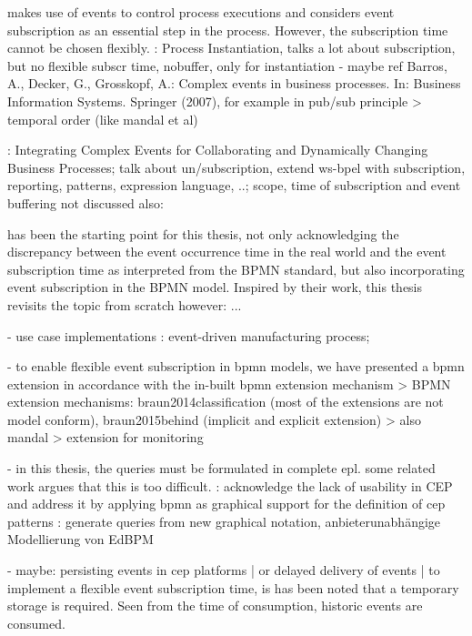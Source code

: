 \cite{Pufahl2017} makes use of events to control process executions and considers event subscription as an essential step in the process. However, the subscription time cannot be chosen flexibly.
\cite{decker2008instantiation}: Process Instantiation, talks a lot about subscription, but no flexible subscr time, nobuffer, only for instantiation
- maybe ref Barros, A., Decker, G., Grosskopf, A.: Complex events in business processes. In: Business Information Systems. Springer (2007), for example in pub/sub principle > temporal order (like mandal et al)


\cite{von2010integrating}: Integrating Complex Events for Collaborating and Dynamically Changing Business Processes; talk about un/subscription, extend ws-bpel with subscription, reporting, patterns, expression language, ..; scope, time of subscription and event buffering not discussed
also: \cite{juric2010wsdl}

\cite{mandal:2017} has been the starting point for this thesis, not only acknowledging the discrepancy between the event occurrence time in the real world and the event subscription time as interpreted from the BPMN standard, but also incorporating event subscription in the BPMN model.
Inspired by their work, this thesis revisits the topic from scratch
however: ...

- use case implementations
\cite{estruch2012event}: event-driven manufacturing process; 

- to enable flexible event subscription in bpmn models, we have presented a bpmn extension in accordance with the in-built bpmn extension mechanism
> BPMN extension mechanisms: braun2014classification (most of the extensions are not model conform), braun2015behind (implicit and explicit extension)
> also mandal
> extension for monitoring


- in this thesis, the queries must be formulated in complete epl. some related work argues that this is too difficult.
\cite{Kunz2010}: acknowledge the lack of usability in CEP and address it by applying bpmn as graphical support for the definition of cep patterns
\cite{gabriel2016konzeptionelle}: generate queries from new graphical notation, anbieterunabhängige Modellierung von EdBPM



- maybe: persisting events in cep platforms | or delayed delivery of events | 
to implement a flexible event subscription time, is has been noted that a temporary storage is required. Seen from the time of consumption, historic events are consumed.

